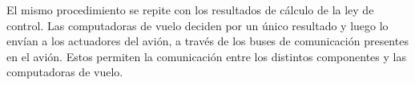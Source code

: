 El mismo procedimiento se repite con los resultados de cálculo de la ley de control. Las computadoras de vuelo deciden por un único resultado y luego lo envían a los actuadores del avión, a través de los buses de comunicación presentes en el avión. Estos permiten la comunicación entre los distintos componentes y las computadoras de vuelo.












